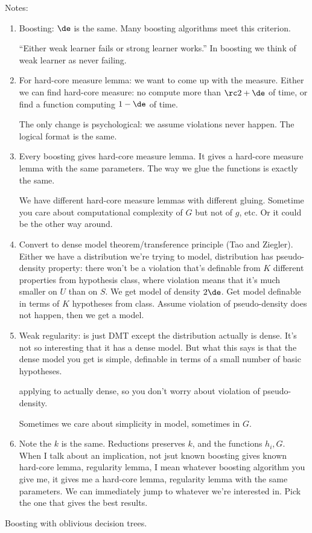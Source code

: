 Notes:
\begin{enumerate}
\item
Boosting: $\de$ is the same.
Many boosting algorithms meet this criterion.

``Either weak learner fails or strong learner works.'' In boosting we think of weak learner as never failing.
\item
For hard-core measure lemma: we want to come up with the measure. Either we can find hard-core measure: no compute more than $\rc2+\de$ of time, or find a function computing $1-\de$ of time.

The only change is psychological: we assume violations never happen. The logical format is the same.
\item
Every boosting gives hard-core measure lemma. It gives a hard-core measure lemma with the same parameters. The way we glue the functions is exactly the same. 

We have different hard-core measure lemmas with different gluing. Sometime you care about computational complexity of $G$ but not of $g$, etc. Or it could be the other way around.
\item
Convert to dense model theorem/transference principle (Tao and Ziegler). Either we have a distribution we're trying to model, distribution has pseudo-density property: there won't be a violation that's definable from $K$ different properties from hypothesis class, where violation means that it's much smaller on $U$ than on $S$.
We get model of density $2\de$. %
Get model definable in terms of $K$ hypotheses from class. Assume violation of pseudo-density does not happen, then we get a model.
\item
Weak regularity: is just DMT except the distribution actually is dense. It's not so interesting that it has a dense model. But what this says is that the dense model you get is simple, definable in terms of a small number of basic hypotheses. 

applying to actually dense, so you don't worry about violation of pseudo-density.

Sometimes we care about simplicity in model, sometimes in $G$.
\item
Note the $k$ is the same. Reductions preserves $k$, and the functions $h_i, G$. When I talk about an implication, not jsut known boosting gives known hard-core lemma, regularity lemma, I mean whatever boosting algorithm you give me, it gives me a hard-core lemma, regularity lemma with the same parameters. We can immediately jump to whatever we're interested in.
Pick the one that gives the best results.
\end{enumerate}
Boosting with oblivious decision trees. 

